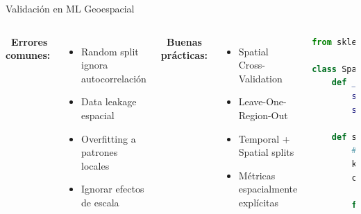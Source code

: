 \documentclass[10pt,aspectratio=169]{beamer}
\begin{document}
\begin{frame}{Validación en ML Geoespacial}
    \begin{columns}
        \textbf{\faExclamationTriangle\ Errores comunes:}
        \begin{itemize}
            \item Random split ignora autocorrelación
            \item Data leakage espacial
            \item Overfitting a patrones locales
            \item Ignorar efectos de escala
        \end{itemize}

        \vspace{3mm}
        \textbf{\faCheckCircle\ Buenas prácticas:}
        \begin{itemize}
            \item Spatial Cross-Validation
            \item Leave-One-Region-Out
            \item Temporal + Spatial splits
            \item Métricas espacialmente explícitas
        \end{itemize}

        \begin{lstlisting}[language=Python,basicstyle=\tiny]
from sklearn.model_selection import BaseCrossValidator

class SpatialKFold(BaseCrossValidator):
    def __init__(self, n_splits=5, buffer_size=1000):
        self.n_splits = n_splits
        self.buffer_size = buffer_size

    def split(self, X, y=None, groups=None):
        # Crear clusters espaciales
        kmeans = KMeans(n_clusters=self.n_splits)
        clusters = kmeans.fit_predict(X[['x', 'y']])

        for i in range(self.n_splits):
            # Test indices
            test_idx = np.where(clusters == i)[0]

            # Train indices (con buffer)
            test_points = X.iloc[test_idx].geometry
            buffer = test_points.buffer(self.buffer_size)

            train_mask = ~X.geometry.within(buffer.unary_union)
            train_idx = np.where(train_mask)[0]

            yield train_idx, test_idx
        \end{lstlisting}
    \end{columns}
\end{frame}
\end{document}
